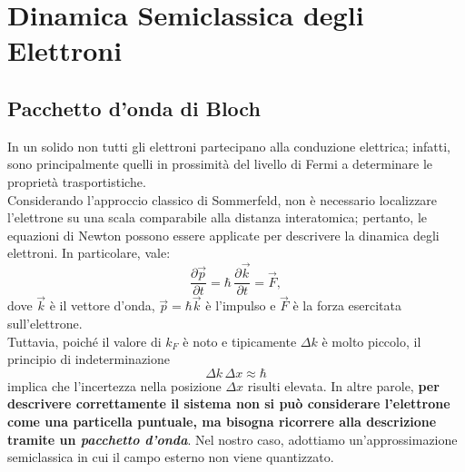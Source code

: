 \chapter{Dinamica Semiclassica degli Elettroni}

\section{Pacchetto d'onda di Bloch}
In un solido non tutti gli elettroni partecipano alla conduzione elettrica; infatti, sono principalmente quelli in prossimità del livello di Fermi a determinare le proprietà trasportistiche.\\
Considerando l'approccio classico di Sommerfeld, non è necessario localizzare l'elettrone su una scala comparabile alla distanza interatomica; pertanto, le equazioni di Newton possono essere applicate per descrivere la dinamica degli elettroni. In particolare, vale:
\[
\frac{\partial \vec{p}}{\partial t} = \hbar\, \frac{\partial \vec{k}}{\partial t} = \vec{F},
\]
dove \(\vec{k}\) è il vettore d'onda, \(\vec{p}=\hbar\vec{k}\) è l'impulso e \(\vec{F}\) è la forza esercitata sull'elettrone.\\
Tuttavia, poiché il valore di \(k_F\) è noto e tipicamente \(\Delta k\) è molto piccolo, il principio di indeterminazione
\[
\Delta k \, \Delta x \approx \hbar
\]
implica che l'incertezza nella posizione \(\Delta x\) risulti elevata. In altre parole, \textbf{per descrivere correttamente il sistema non si può considerare l'elettrone come una particella puntuale, ma bisogna ricorrere alla descrizione tramite un \emph{pacchetto d'onda}}. Nel nostro caso, adottiamo un'approssimazione semiclassica in cui il campo esterno non viene quantizzato.\\\\

